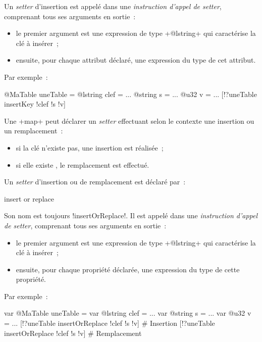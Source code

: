 Un \emph{setter} d'insertion est appelé dans une \emph{instruction d'appel de setter}, comprenant tous ses arguments en sortie~:
\begin{itemize}
  \item le premier argument est une expression de type \ggsq+@lstring+ qui caractérise la clé à insérer~;
  \item ensuite, pour chaque attribut déclaré, une expression du type de cet attribut.
\end{itemize}

Par exemple~:
\begin{galgas4}
@MaTable uneTable = {}
@lstring clef = ...
@string s = ...
@u32 v = ...
[!?uneTable insertKey !clef !s !v]
\end{galgas4}




Une \ggsq+map+ peut déclarer un \emph{setter} effectuant selon le contexte une insertion ou un remplacement~:
\begin{itemize}
  \item si la clé n'existe pas, une insertion est réalisée~;
  \item si elle existe , le remplacement est effectué.
\end{itemize}

Un \emph{setter} d'insertion ou de remplacement est déclaré par~:

\begin{galgas4}
insert or replace
\end{galgas4}

\begin{galgas4}
\end{galgas4}

Son nom est toujours \ggsq!insertOrReplace!. Il est appelé dans une \emph{instruction d'appel de setter}, comprenant tous ses arguments en sortie~:
\begin{itemize}
  \item le premier argument est une expression de type \ggsq+@lstring+ qui caractérise la clé à insérer~;
  \item ensuite, pour chaque propriété déclarée, une expression du type de cette propriété.
\end{itemize}

Par exemple~:
\begin{galgas4}
var @MaTable uneTable = {}
var @lstring clef = ...
var @string s = ...
var @u32 v = ...
[!?uneTable insertOrReplace !clef !s !v] # Insertion
[!?uneTable insertOrReplace !clef !s !v] # Remplacement
\end{galgas4}








